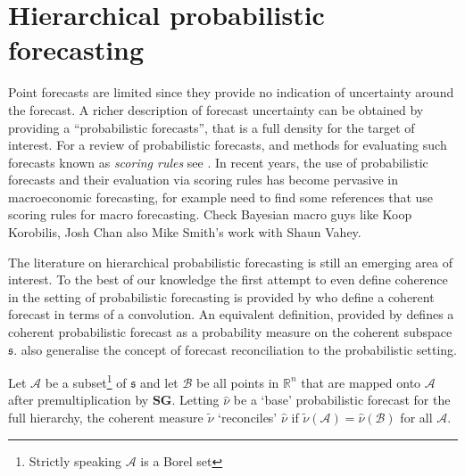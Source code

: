 \documentclass[graybox]{svmult}
\begin{document}
\section{Hierarchical probabilistic forecasting}

Point forecasts are limited since they provide no indication of uncertainty around the forecast. A richer description of forecast uncertainty can be obtained by providing a ``probabilistic forecasts'', that is a full density for the target of interest. For a review of probabilistic forecasts, and methods for evaluating such forecasts known as {\em scoring rules} see  \citep{Gneiting2014}. In recent years, the use of probabilistic forecasts and their evaluation via scoring rules has become pervasive in macroeconomic forecasting, for example {\color{red} need to find some references that use scoring rules for macro forecasting.  Check Bayesian macro guys like Koop Korobilis, Josh Chan also Mike Smith's work with Shaun Vahey}.


The literature on hierarchical probabilistic forecasting is still an emerging area of interest. %
To the best of our knowledge the first attempt to even define coherence in the setting of probabilistic forecasting is provided by \cite{Taieb2017} who define a coherent forecast in terms of a convolution.  An equivalent definition, provided by \cite{Gamakumara2018} defines a  coherent probabilistic forecast as a probability measure on the coherent subspace $\mathfrak{s}$.  \cite{Gamakumara2018} also generalise the concept of forecast reconciliation to the probabilistic setting.

\begin{definition} Let $\mathcal{A}$ be a subset\footnote{Strictly speaking $\mathcal{A}$ is a Borel set} of $\mathfrak{s}$ and let $\mathcal{B}$ be all points in $\mathbb{R}^n$ that are mapped onto  $\mathcal{A}$ after premultiplication by $\bm{S}\bm{G}$. Letting $\hat{\nu}$ be a `base' probabilistic forecast for the full hierarchy, the coherent measure $\tilde{\nu}$ `reconciles' $\hat{\nu}$ if $\tilde{\nu}(\mathcal{A})=\hat{\nu}(\mathcal{B})$ for all $\mathcal{A}$.
\end{definition}
\end{document}
